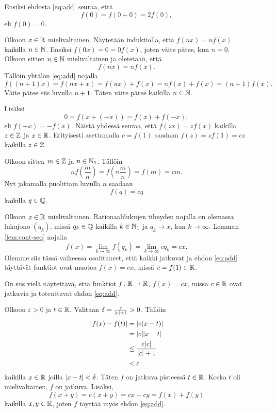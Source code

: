 \documentclass[11pt,a4paper]{amsart}
\begin{document}
\begin{solution}
  Ensiksi ehdosta \eqref{eq:add} seuraa, että
  \[
    f(0) = f(0 + 0) = 2f(0),
  \]
  eli \(f(0) = 0\).

  Olkoon \(x \in \mathbb{R}\) mielivaltainen. Näytetään induktiolla, että
  \(f(nx) = nf(x)\) kaikilla \(n \in \mathbb{N}\). Ensiksi
  \(f(0x) = 0 = 0f(x)\), joten väite pätee, kun \(n = 0\). Olkoon sitten
  \(n \in \mathbb{N}\) mielivaltainen ja oletetaan, että
  \[
    f(nx) = nf(x).
  \]
  Tällöin yhtälön \eqref{eq:add} nojalla
  \[
    f((n + 1)x) = f(nx + x) = f(nx) + f(x) = nf(x) + f(x) = (n + 1)f(x).
  \]
  Väite pätee siis luvulla \(n + 1\). Täten väite pätee kaikilla \(n \in \mathbb{N}\).

  Lisäksi
  \[
    0 = f(x + (-x)) = f(x) + f(-x),
  \]
  eli \(f(-x) = -f(x)\). Näistä yhdessä seuraa, että \(f(zx) = zf(x)\)
  kaikilla \(z \in \mathbb{Z}\) ja \(x \in \mathbb{R}\). Erityisesti asettamalla
  \(c = f(1)\) saadaan \(f(z) = zf(1) = cz\) kaikilla \(z \in \mathbb{Z}\).

  Olkoon sitten \(m \in \mathbb{Z}\) ja \(n \in \mathbb{N}_1\). Tällöin
  \[
    nf\left(\frac{m}{n}\right) = f\left(n\frac{m}{n}\right) = f(m) = cm.
  \]
  Nyt jakamalla puolittain luvulla \(n\) saadaan
  \[
    f(q) = cq
  \]
  kaikilla \(q \in \mathbb{Q}\).

  Olkoon \(x \in \mathbb{R}\) mielivaltainen. Rationaalilukujen tiheyden nojalla
  on olemassa lukujono \((q_k)\), missä \(q_k \in \mathbb{Q}\) kaikilla
  \(k \in \mathbb{N}_1\) ja \(q_k \to x\), kun \(k \to \infty\).
  Lemman \eqref{lem:cont-seq} nojalla
  \[
    f(x) = \lim_{k \to \infty} f(q_k) = \lim_{k \to \infty} cq_k = cx.
  \]
  Olemme siis tässä vaiheessa osoittaneet, että kaikki jatkuvat ja
  ehdon \eqref{eq:add} täyttävät funktiot ovat muotoa \(f(x) = cx\),
  missä \(c = f(1) \in \mathbb{R}\).

  On siis vielä näytettävä, että funktiot \(f \colon \mathbb{R} \to \mathbb{R}\),
  \(f(x) = cx\),
  missä \(c \in \mathbb{R}\) ovat jatkuvia ja toteuttavat ehdon \eqref{eq:add}.

  Olkoon \(\varepsilon > 0\) ja \(t \in \mathbb{R}\). Valitaan \(\delta =
  \frac{\varepsilon}{\lvert c\rvert + 1} > 0\). Tällöin
  \[
    \begin{aligned}
      \lvert f(x) - f(t)\rvert &= \lvert c(x - t)\rvert  \\
      &= \lvert c\rvert\lvert x - t\rvert \\
      &\leq \frac{\varepsilon\lvert c\rvert}{\lvert c\rvert + 1} \\
      &< \varepsilon
    \end{aligned}
  \]
  kaikilla \(x \in \mathbb{R}\) joilla \(\lvert x - t\rvert < \delta\). Täten \(f\) on jatkuva
  pisteessä \(t \in \mathbb{R}\). Koska \(t\) oli mielivaltainen, \(f\) on jatkuva.
  Lisäksi,
  \[
    f(x + y) = c(x + y) = cx + cy = f(x) + f(y)
  \]
  kaikilla \(x,y \in \mathbb{R}\), joten \(f\) täyttää myös ehdon \eqref{eq:add}.


\end{solution}
\end{document}
